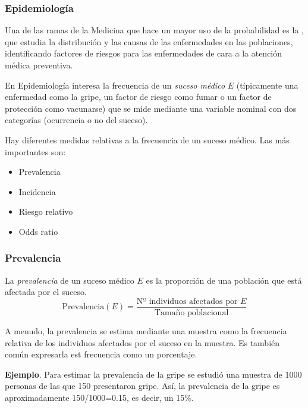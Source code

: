 \begin{frame}
\frametitle{Epidemiología}
Una de las ramas de la Medicina que hace un mayor uso de la probabilidad es la , que estudia la distribución y las causas de las enfermedades en las poblaciones, identificando factores de riesgos para las enfermedades de cara a la atención médica preventiva. 

En Epidemiología interesa la frecuencia de un \emph{suceso médico} $E$ (típicamente una enfermedad como la gripe, un factor de riesgo como fumar o un factor de protección como vacunarse) que se mide mediante una variable nominal con dos categorías (ocurrencia o no del suceso).

Hay diferentes medidas relativas a la frecuencia de un suceso médico.
Las más importantes son:

\begin{itemize}
  \item Prevalencia
  \item Incidencia
  \item Riesgo relativo
  \item Odds ratio
\end{itemize}
\end{frame}


\begin{frame}
\frametitle{Prevalencia}
\begin{definicion}[Prevalencia]
La \emph{prevalencia} de un suceso médico $E$ es la proporción de una población que está afectada por el suceso. 
\[
  \mbox{Prevalencia}(E) = \frac{\mbox{Nº individuos afectados por $E$}}{\mbox{Tamaño poblacional}}
\]
\end{definicion}

A menudo, la prevalencia se estima mediante una muestra como la frecuencia relativa de los individuos afectados por el suceso en la muestra.
Es también común expresarla est frecuencia como un porcentaje. 

\textbf{Ejemplo}. Para estimar la prevalencia de la gripe se estudió una muestra de 1000 personas de las que 150 presentaron gripe.
Así, la prevalencia de la gripe es aproximadamente 150/1000=0.15, es decir, un 15\%. 
\end{frame}
  

